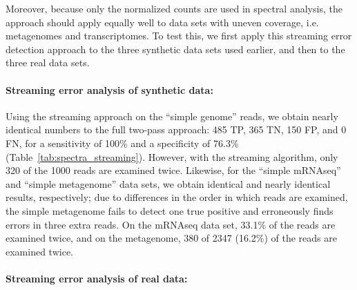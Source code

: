 \documentclass{article}
\begin{document}
Moreover, because only the normalized counts are used in spectral
analysis, the approach should apply equally well to data sets with
uneven coverage, i.e. metagenomes and transcriptomes.  To test this,
we first apply this streaming error detection approach to the three
synthetic data sets used earlier, and then to the three real data
sets.

\paragraph{Streaming error analysis of synthetic data:}

Using the streaming approach on the ``simple genome'' reads, we obtain
nearly identical numbers to the full two-pass approach: 485 TP, 365
TN, 150 FP, and 0 FN, for a sensitivity of 100\% and a specificity of
76.3\% (Table~\ref{tab:spectra_streaming}).  However, with the
streaming algorithm, only 320 of the 1000 reads are examined twice.
Likewise, for the ``simple mRNAseq'' and ``simple metagenome'' data
sets, we obtain identical and nearly identical results, respectively;
due to differences in the order in which reads are examined, the
simple metagenome fails to detect one true positive and erroneously
finds errors in three extra reads.  On the mRNAseq data set, 33.1\% of
the reads are examined twice, and on the metagenome, 380 of 2347
(16.2\%) of the reads are examined twice.

\paragraph{Streaming error analysis of real data:}



\end{document}
